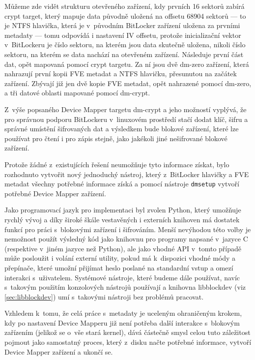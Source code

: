 Můžeme zde vidět strukturu otevřeného zařízení, kdy prvních 16 sektorů zabírá crypt target, který mapuje data původně uložená na offsetu 68904 sektorů --- to je NTFS hlavička, která je v~původním BitLocker zařízení uložena za prvními metadaty --- tomu odpovídá i nastavení IV offsetu, protože inicializační vektor v~BitLockeru je číslo sektoru, na kterém jsou data skutečně uložena, nikoli číslo sektoru, na kterém se data nachází na otevřeném zařízení. Následuje první část dat, opět mapovaná pomocí crypt targetu. Za ní jsou dvě dm-zero zařízení, která nahrazují první kopii FVE metadat a NTFS hlavičku, přesunutou na začátek zařízení. Zbývají již jen dvě kopie FVE metadat, opět nahrazené pomocí dm-zero, a tři datové oblasti mapované pomocí dm-crypt.

\label{sec:implementace-nastroj}

Z~výše popsaného Device Mapper targetu dm-crypt a jeho možností vyplývá, že pro správnou podporu BitLockeru v~linuxovém prostředí stačí dodat klíč, šifru a správné umístění šifrovaných dat a výsledkem bude blokové zařízení, které lze používat pro čtení i pro zápis stejně, jako jakékoli jiné nešifrované blokové zařízení.

Protože žádné z~existujících řešení neumožňuje tyto informace získat, bylo rozhodnuto vytvořit nový jednoduchý nástroj, který z~BitLocker hlavičky a FVE metadat všechny potřebné informace získá a pomocí nástroje \texttt{dmsetup} vytvoří potřebné Device Mapper zařízení.


Jako programovací jazyk pro implementaci byl zvolen Python, který umožňuje rychlý vývoj a díky široké škále vestavěných i externích knihoven má dostatek funkcí pro práci s~blokovými zařízení i šifrováním. Menší nevýhodou této volby je nemožnost použít výsledný kód jako knihovnu pro programy napsané v~jazyce C (respektive v~jiném jazyce než Python), ale jako vhodné API v~tomto případě může posloužit i volání externí utility, pokud má k~dispozici vhodné módy a přepínače, které umožní přijímat heslo poslané na standardní vstup a omezí interakci s~uživatelem. Systémové nástroje, které budeme dále používat, navíc s~takovým použitím konzolových nástrojů používají a knihovna libblockdev (viz \ref{sec:libblockdev}) umí s~takovými nástroji bez problémů pracovat.

Vzhledem k~tomu, že celá práce s~metadaty je uceleným ohraničeným krokem, kdy po nastavení Device Mapperu již není potřeba další interakce s~blokovým zařízením (jelikož se o~vše stará kernel), dává částečně smysl celou tuto záležitost pojmout jako samostatný proces, který z~disku načte potřebné informace, vytvoří Device Mapper zařízení a ukončí se.

